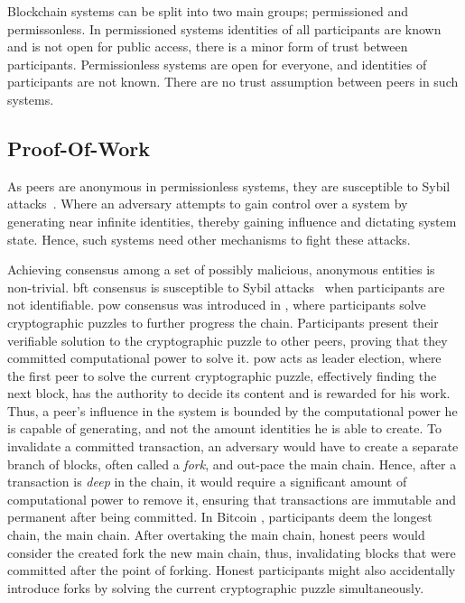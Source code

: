 \documentclass[USenglish]{uit-thesis}
\begin{document}
Blockchain systems can be split into two main groups; permissioned and permissonless.
In permissioned systems identities of all participants are known and is not open for public access, there is a minor form of trust between participants.
Permissionless systems are open for everyone, and identities of participants are not known.
There are no trust assumption between peers in such systems. 


\subsection{Proof-Of-Work}
As peers are anonymous in permissionless systems, they are susceptible to Sybil attacks~\cite{sybil}.
Where an adversary attempts to gain control over a system by generating near infinite identities, thereby gaining influence and dictating system state.
Hence, such systems need other mechanisms to fight these attacks. 

Achieving consensus among a set of possibly malicious, anonymous entities is non-trivial.
\gls{bft} consensus is susceptible to Sybil attacks~\cite{sybil} when participants are not identifiable.
\gls{pow} consensus was introduced in \cite{bitcoin}, where participants solve cryptographic puzzles to further progress the chain.
Participants present their verifiable solution to the cryptographic puzzle to other peers, proving that they committed computational power to solve it.
\gls{pow} acts as leader election, where the first peer to solve the current cryptographic puzzle, effectively finding the next block, has the authority to decide its content and is rewarded for his work.
Thus, a peer's influence in the system is bounded by the computational power he is capable of generating, and not the amount identities he is able to create.
To invalidate a committed transaction, an adversary would have to create a separate branch of blocks, often called a \textit{fork}, and out-pace the main chain.
Hence, after a transaction is \textit{deep} in the chain, it would require a significant amount of computational power to remove it, ensuring that transactions are immutable and permanent after being committed.
In Bitcoin \cite{bitcoin}, participants deem the longest chain, the main chain.
After overtaking the main chain, honest peers would consider the created fork the new main chain, thus, invalidating blocks that were committed after the point of forking.
Honest participants might also accidentally introduce forks by solving the current cryptographic puzzle simultaneously.
\end{document}
